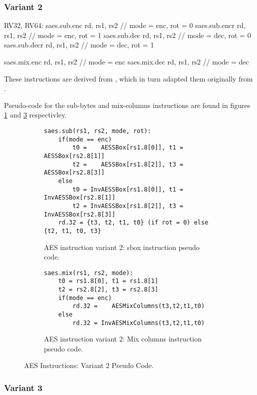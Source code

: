 \subsubsection{Variant 2}

\begin{cryptoisa}
RV32, RV64:
    saes.sub.enc    rd, rs1, rs2 // mode = enc, rot = 0
    saes.sub.encr   rd, rs1, rs2 // mode = enc, rot = 1
    saes.sub.dec    rd, rs1, rs2 // mode = dec, rot = 0
    saes.sub.decr   rd, rs1, rs2 // mode = dec, rot = 1

    saes.mix.enc    rd, rs1, rs2 // mode = enc
    saes.mix.dec    rd, rs1, rs2 // mode = dec
\end{cryptoisa}

These instructions are derived from \cite{MPP:19}, which in turn adapted
them originally from \cite{TG:06}.

Pseudo-code for the sub-bytes and mix-columns instructions are found in
figures
\ref{fig:pesudo:aes:v2:sub}
and
\ref{fig:pesudo:aes:v2:mix}
respectivley.

\begin{figure}
\begin{subfigure}[b]{1.0\textwidth}
\begin{lstlisting}
saes.sub(rs1, rs2, mode, rot):
    if(mode == enc)
        t0 =    AESSBox[rs1.8[0]], t1 =    AESSBox[rs2.8[1]]
        t2 =    AESSBox[rs1.8[2]], t3 =    AESSBox[rs2.8[3]]
    else
        t0 = InvAESSBox[rs1.8[0]], t1 = InvAESSBox[rs2.8[1]]
        t2 = InvAESSBox[rs1.8[2]], t3 = InvAESSBox[rs2.8[3]]
    rd.32 = {t3, t2, t1, t0} (if rot = 0) else {t2, t1, t0, t3}
\end{lstlisting}
\caption{AES instruction variant 2: sbox instruction pseudo code.}
\label{fig:pesudo:aes:v2:sub}
\end{subfigure}
\begin{subfigure}[b]{1.0\textwidth}
\begin{lstlisting}
saes.mix(rs1, rs2, mode):
    t0 = rs1.8[0], t1 = rs1.8[1]
    t2 = rs2.8[2], t3 = rs2.8[3]
    if(mode == enc)
        rd.32 =    AESMixColumns(t3,t2,t1,t0)
    else
        rd.32 = InvAESMixColumns(t3,t2,t1,t0)
\end{lstlisting}
\caption{AES instruction variant 2: Mix columns instruction pseudo code.}
\label{fig:pesudo:aes:v2:mix}
\end{subfigure}
\caption{AES Instructions: Variant 2 Pseudo Code.}
\end{figure}

\subsubsection{Variant 3}


